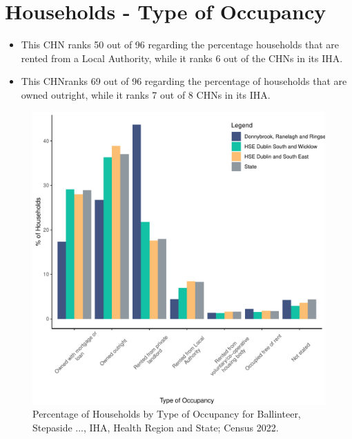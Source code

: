 \documentclass{article}
\begin{document}
\section{Households - Type of Occupancy}\label{sect:Households}
\begin{itemize}
\item This CHN ranks  50 out of 96 regarding the percentage households that are rented from a Local Authority, while it ranks  6 out of the CHNs in its IHA. 
\item This CHNranks  69 out of 96 regarding the percentage of households that are owned outright, while it ranks   7 out of 8 CHNs in its IHA.
\end{itemize}
\begin{figure}[H]
	\centering
	\includegraphics[width = 140mm]{../figures/HouseholdsED.pdf}
	\caption{Percentage of Households by Type of Occupancy for Ballinteer, Stepaside ..., IHA, Health Region and State; Census 2022.}
	\label{fig:vbnv}
	\end{figure}
\end{document}
